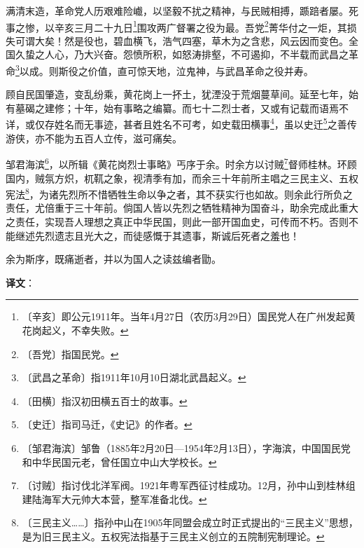 \documentclass[12pt,UTF-8,openany]{ctexbook}
\begin{document}
\begin{normalsize}
    
    满清末造，革命党人历艰难险巇，以坚毅不扰之精神，与民贼相搏，踬踣者屡。死事之惨，以辛亥三月二十九日\footnote{〔辛亥〕即公元1911年。当年4月27日（农历3月29日）国民党人在广州发起黄花岗起义，不幸失败。}围攻两广督署之役为最。吾党\footnote{〔吾党〕指国民党。}菁华付之一炬，其损失可谓大矣！然是役也，碧血横飞，浩气四塞，草木为之含悲，风云因而变色。全国久蛰之人心，乃大兴奋。怨愤所积，如怒涛排壑，不可遏抑，不半载而武昌之革命\footnote{〔武昌之革命〕指1911年10月10日湖北武昌起义。}以成。则斯役之价值，直可惊天地，泣鬼神，与武昌革命之役并寿。
    
    顾自民国肇造，变乱纷乘，黄花岗上一抔土，犹湮没于荒烟蔓草间。延至七年，始有墓碣之建修；十年，始有事略之编纂。而七十二烈士者，又或有记载而语焉不详，或仅存姓名而无事迹，甚者且姓名不可考，如史载田横事\footnote{〔田横〕指汉初田横五百士的故事。}，虽以史迁\footnote{〔史迁〕指司马迁，《史记》的作者。}之善传游侠，亦不能为五百人立传，滋可痛矣。
    
    邹君海滨\footnote{〔邹君海滨〕邹鲁（1885年2月20日—1954年2月13日），字海滨，中国国民党和中华民国元老，曾任国立中山大学校长。}，以所辑《黄花岗烈士事略》丐序于余。时余方以讨贼\footnote{〔讨贼〕指讨伐北洋军阀。1921年粤军西征讨桂成功。12月，孙中山到桂林组建陆海军大元帅大本营，整军准备北伐。}督师桂林。环顾国内，贼氛方炽，杌靰之象，视清季有加，而余三十年前所主唱之三民主义、五权宪法\footnote{〔三民主义……〕指孙中山在1905年同盟会成立时正式提出的“三民主义”思想，是为旧三民主义。五权宪法指基于三民主义创立的五院制宪制理论。}，为诸先烈所不惜牺牲生命以争之者，其不获实行也如故。则余此行所负之责任，尤倍重于三十年前。倘国人皆以先烈之牺牲精神为国奋斗，助余完成此重大之责任，实现吾人理想之真正中华民国，则此一部开国血史，可传而不朽。否则不能继述先烈遗志且光大之，而徒感慨于其遗事，斯诚后死者之羞也！
    
    余为斯序，既痛逝者，并以为国人之读兹编者勖。
\end{normalsize}


\newpage

\textbf{译文}：

\vspace{1em}
\end{document}
